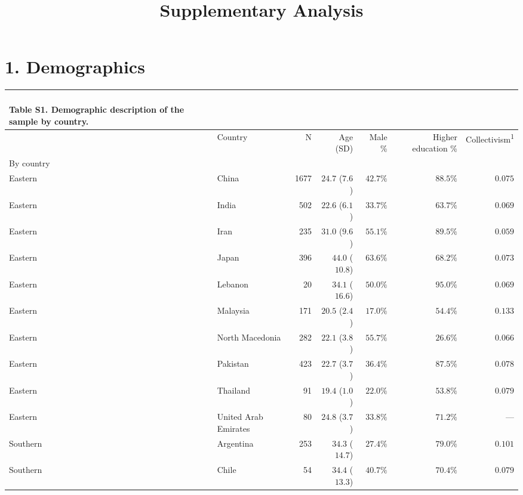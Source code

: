 \documentclass[
]{article}
\title{Supplementary Analysis}
\author{}
\date{\vspace{-2.5em}}
\begin{document}
\maketitle

\setcounter{table}{0}  \renewcommand{\thetable}{S\arabic{table}} \setcounter{figure}{0} \renewcommand{\thefigure}{S\arabic{figure}}

\hypertarget{demographics}{%
\section{1. Demographics}\label{demographics}}

\captionsetup[table]{labelformat=empty,skip=1pt}
\begin{longtable}{llrrrrr}
\caption*{
{\large  } \\ 
{\small Table S1. Demographic description of the sample by country.}
} \\ 
\toprule
 & Country & N & Age (SD) & Male \% & Higher education \% & Collectivism\textsuperscript{1} \\ 
\midrule
\multicolumn{1}{l}{By country} \\ 
\midrule
Eastern & China & 1677 & $24.7$ ($7.6$) & $42.7\%$ & $88.5\%$ & $0.075$ \\ 
Eastern & India & 502 & $22.6$ ($6.1$) & $33.7\%$ & $63.7\%$ & $0.069$ \\ 
Eastern & Iran & 235 & $31.0$ ($9.6$) & $55.1\%$ & $89.5\%$ & $0.059$ \\ 
Eastern & Japan & 396 & $44.0$ ($10.8$) & $63.6\%$ & $68.2\%$ & $0.073$ \\ 
Eastern & Lebanon & 20 & $34.1$ ($16.6$) & $50.0\%$ & $95.0\%$ & $0.069$ \\ 
Eastern & Malaysia & 171 & $20.5$ ($2.4$) & $17.0\%$ & $54.4\%$ & $0.133$ \\ 
Eastern & North Macedonia & 282 & $22.1$ ($3.8$) & $55.7\%$ & $26.6\%$ & $0.066$ \\ 
Eastern & Pakistan & 423 & $22.7$ ($3.7$) & $36.4\%$ & $87.5\%$ & $0.078$ \\ 
Eastern & Thailand & 91 & $19.4$ ($1.0$) & $22.0\%$ & $53.8\%$ & $0.079$ \\ 
Eastern & United Arab Emirates & 80 & $24.8$ ($3.7$) & $33.8\%$ & $71.2\%$ & --- \\ 
Southern & Argentina & 253 & $34.3$ ($14.7$) & $27.4\%$ & $79.0\%$ & $0.101$ \\ 
Southern & Chile & 54 & $34.4$ ($13.3$) & $40.7\%$ & $70.4\%$ & $0.079$ \\ 

\end{longtable}
\end{document}
